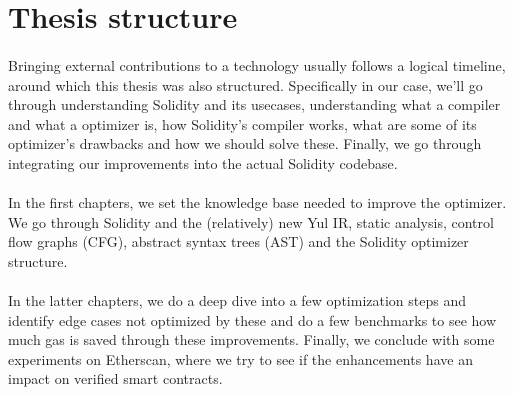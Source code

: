 \section{Thesis structure}
\paragraph*{}
Bringing external contributions to a technology usually follows a logical timeline, around which this thesis was also structured. Specifically in our case, we'll go through understanding Solidity and its usecases, understanding what a compiler and what a optimizer is, how Solidity's compiler works, what are some of its optimizer's drawbacks and how we should solve these. Finally, we go through integrating our improvements into the actual Solidity codebase.

\paragraph*{}
In the first chapters, we set the knowledge base needed to improve the optimizer. We go through Solidity and the (relatively) new Yul IR, static analysis, control flow graphs (CFG), abstract syntax trees (AST) and the Solidity optimizer structure.

\paragraph*{}
In the latter chapters, we do a deep dive into a few optimization steps and identify edge cases not optimized by these and do a few benchmarks to see how much gas is saved through these improvements. Finally, we conclude with some experiments on Etherscan, where we try to see if the enhancements have an impact on verified smart contracts.
